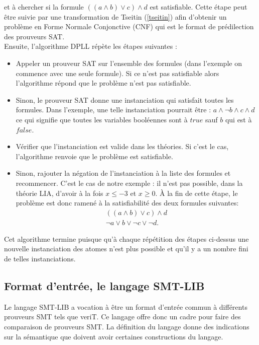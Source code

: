 \documentclass[11pt]{article}
\begin{document}
et à chercher si la formule  $((a \wedge b) \vee c) \wedge d$ est satisfiable. Cette étape peut être suivie par une transformation de Tseitin (\ref{tseitin}) afin d'obtenir un problème en Forme Normale Conjonctive (CNF) qui est le format de prédilection des prouveurs SAT. \\

Ensuite, l'algorithme DPLL répète les étapes suivantes :
\begin{itemize}
\item Appeler un prouveur SAT sur l'ensemble des formules (dans l'exemple on commence avec une seule formule). Si ce n'est pas satisfiable alors l'algorithme répond que le problème n'est pas satisfiable.
\item Sinon, le prouveur SAT donne une instanciation qui satisfait toutes les formules. Dans l'exemple, une telle instanciation pourrait être :
  $a \wedge \neg b \wedge c \wedge d$
ce qui signifie que toutes les variables booléennes sont à $true$ sauf $b$ qui est à $false$.
\item Vérifier que l'instanciation est valide dans les théories. Si c'est le cas, l'algorithme renvoie que le problème est satisfiable.
\item Sinon, rajouter la négation de l'instanciation à la liste des formules et recommencer. C'est le cas de notre exemple : il n'est pas possible, dans la théorie LIA, d'avoir à la fois $x \leq -3$ et $x \geq 0$. À la fin de cette étape, le problème est donc ramené à la satisfiabilité des deux formules suivantes:
  \begin{align*}
    ((a \wedge b) \vee c) \wedge d \\
    \neg a \vee b \vee \neg c \vee \neg d.
  \end{align*}
\end{itemize}

Cet algorithme termine puisque qu'à chaque répétition des étapes ci-dessus une nouvelle instanciation des atomes n'est plus possible et qu'il y a un nombre fini de telles instanciations. 

\subsection{Format d'entrée, le langage SMT-LIB} \label{smt-lib}

Le langage SMT-LIB a vocation à être un format d'entrée commun à différents prouveurs SMT tels que veriT. Ce langage offre donc un cadre pour faire des comparaison de prouveurs SMT. La définition du langage \cite{smtlib} donne des indications sur la sémantique que doivent avoir certaines constructions du langage.\\
\end{document}

